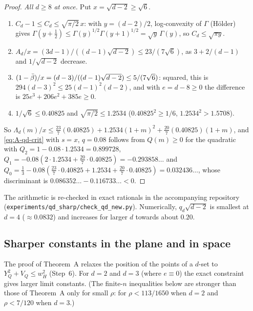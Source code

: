 \begin{proof}
\emph{All $d \ge 8$ at once.} Put $x = \sqrt{d-2} \ge \sqrt6$.
\begin{enumerate}[label=(\alph*)]
  \item $C_d - 1 \le C_d \le \sqrt{\pi/2}\, x$: with $y = (d-2)/2$, log-convexity of $\Gamma$
    (H\"older) gives $\Gamma(y + \frac12) \le \Gamma(y)^{1/2}\Gamma(y+1)^{1/2} = \sqrt y\,\Gamma(y)$,
    so $C_d \le \sqrt{\pi y}$.
  \item $A_d/x = (3d-1)/((d-1)\sqrt{d-2}) \le 23/(7\sqrt6)$, as $3 + 2/(d-1)$ and $1/\sqrt{d-2}$
    decrease.
  \item $(1 - \bar\beta)/x = (d-3)/((d-1)\sqrt{d-2}) \le 5/(7\sqrt6)$: squared, this is
    $294(d-3)^2 \le 25(d-1)^2(d-2)$, and with $e = d - 8 \ge 0$ the difference is
    $25e^3 + 206e^2 + 385e \ge 0$.
  \item $1/\sqrt6 \le 0.40825$ and $\sqrt{\pi/2} \le 1.2534$ ($0.40825^2 \ge 1/6$,
    $1.2534^2 > 1.5708$).
\end{enumerate}
So $\Lambda_d(m)/x \le \frac{23}{7}(0.40825) + 1.2534(1+m)^2 + \frac{20}{7}(0.40825)(1+m)$,
and \eqref{eq:A-qd-crit} with $s = x$, $q = 0.08$ follows from $Q(m) \ge 0$ for the quadratic with
$Q_2 = 1 - 0.08 \cdot 1.2534 = 0.899728$, $Q_1 = -0.08(2 \cdot 1.2534 + \frac{20}{7} \cdot 0.40825)
= -0.293858\ldots$ and $Q_0 = \frac13 - 0.08(\frac{23}{7} \cdot 0.40825 + 1.2534 +
\frac{20}{7} \cdot 0.40825) = 0.032436\ldots$, whose discriminant is
$0.086352\ldots - 0.116733\ldots < 0$.
\end{proof}

The arithmetic is re-checked in exact rationals in the accompanying repository
(\nolinkurl{experiments/qd_sharp/check_qd_new.py}). Numerically, $q_d\sqrt{d-2}$ is smallest at
$d = 4$ ($\approx 0.0832$) and increases for larger $d$ towards about $0.20$.

\subsection{Sharper constants in the plane and in space}
\label{sec:A-sharp}

The proof of Theorem~A relaxes the position of the points of a $d$-set to $Y_Q^2 + V_Q \le w_H^2$
(Step~6). For $d = 2$ and $d = 3$ (where $e \equiv 0$) the exact constraint gives larger limit
constants. (The finite-$n$ inequalities below are stronger than those of Theorem~A only for small $\rho$:
for $\rho < 113/1650$ when $d = 2$ and $\rho < 7/120$ when $d = 3$.)

